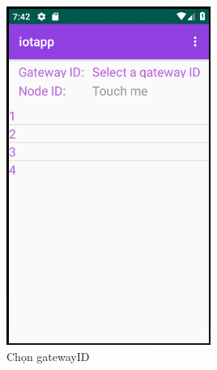 \documentclass[a4paper]{article}
\begin{document}
\begin{enumerate}
\begin{figure}[!tbp]
\begin{subfigure}[b]{0.3\textwidth}
    \includegraphics[width=\textwidth]{SelectgatewayID.png}
    \caption{Chọn gatewayID}
    \label{fig:SelectgatewayIDApp}
  \end{subfigure}
  \begin{subfigure}[b]{0.3\textwidth}

\end{subfigure}
\end{figure}
\end{enumerate}
\end{document}

